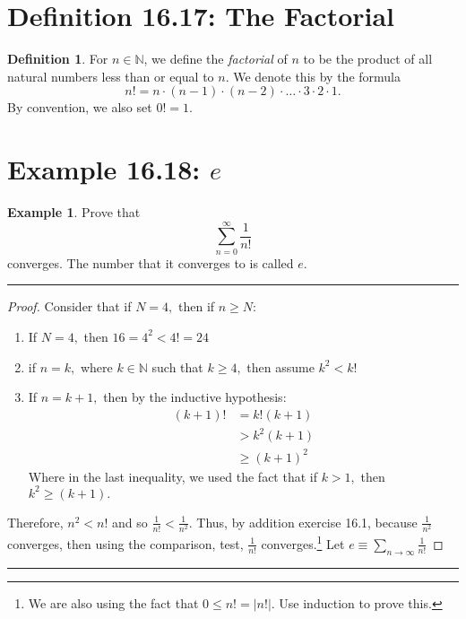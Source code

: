 \documentclass[openany, amssymb, psamsfonts]{amsart}
\newcommand{\bbN}{\mathbb{N}}
\theoremstyle{definition}
\newtheorem{defn}{Definition}[section]
\newtheorem{exmp}{Example}[section]
\numberwithin{equation}{section}
\begin{document}
\section*{Definition 16.17: The Factorial}
\label{16.17}
\begin{defn}
	For $n\in\bbN$, we define the \emph{factorial} of $n$ to be the product of all natural numbers less than or equal to $n$.  We denote this by the formula
	\[
		n! = n \cdot (n-1) \cdot (n-2) \cdot \dots \cdot 3 \cdot 2 \cdot 1.
	\] 
	By convention, we also set $0! = 1$.
\end{defn}

\section*{Example 16.18: $e$}
\begin{exmp} 
\label{16.18}
Prove that 
	\[
		\sum_{n = 0}^{\infty} \frac{1}{n!}
	\]
	converges. The number that it converges to is called $e$.
\end{exmp}
\bigskip
\vspace{4pt}     \hrule   \vspace{4pt}\begin{proof}
    Consider that if $N = 4,$ then if $n\geq N:$
\begin{enumerate}
    \item If $N =4,$ then $16 = 4^2 < 4! = 24$\\
    \item if $n = k,$ where $k\in \bbN$ such that $k\geq 4,$ then assume $k^2 < k!$
    \item If $n = k+1,$ then by the inductive hypothesis:
    \begin{align*}
    (k+1)! &= k!(k+1)\\
    &>k^2(k+1)\\
    &\geq (k+1)^2
    \end{align*}
    Where in the last inequality, we used the fact that if $k>1,$ then $k^2 \geq (k+1).$ 
\end{enumerate}
Therefore, $n^2<n!$ and so $\frac{1}{n!}< \frac{1}{n^2}.$ Thus, by addition exercise 16.1, because $\frac{1}{n^2}$ converges, then using the comparison, test, $\frac{1}{n!}$ converges.\footnote{We are also using the fact that $0\leq n! = |n!|.$ Use induction to prove this.} Let $e \equiv \displaystyle\sum_{n\to \infty}\frac{1}{n!}$
\end{proof}\vspace{4pt}     \hrule   \vspace{4pt}
\end{document}
